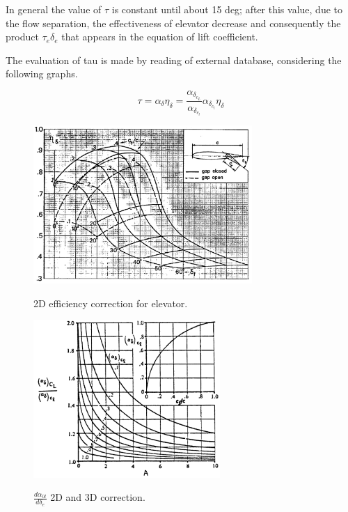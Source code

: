  In general the value of $\tau$ is constant until about 15 deg; after this value, due to the flow separation, the effectiveness of elevator decrease and consequently the product $ \tau_e \delta_e$ that appears in the equation of lift coefficient.
		
		
The evaluation of tau is made by reading of external database, considering the following graphs.
	
\begin{equation}
\tau = \alpha_{\delta} \eta_{\delta} = \frac{\alpha_{{\delta}_{c_L}}}{\alpha_{{\delta}_{c_l}}}\alpha_{{\delta}_{c_l}} \eta_{\delta}
\end{equation}



\begin{figure}[H]
\centering
{\includegraphics[height=6cm]{Immagini/Eta_Delta_Plain.png}} 
\caption{2D efficiency correction for elevator.}
\label{efficiency}
\end{figure} 		


\begin{figure}[H]
\centering
{\includegraphics[height=6cm]{Immagini/alfadelta.png}} 
\caption{$\frac{d \alpha_{0l}}{d \delta_e}$ 2D and 3D correction.}
\label{efficiency}
\end{figure} 		
		
